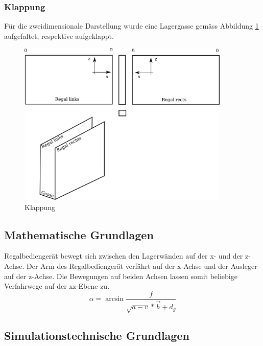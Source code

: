 \subsubsection{Klappung}
Für die zweidimensionale Darstellung wurde eine Lagergasse gemäss Abbildung \ref{fig:klapp} aufgefaltet, respektive aufgeklappt.
%
\begin{figure}[h]
  \begin{center}
    \includegraphics[width=0.9\textwidth]{images/klappung.png}
    \caption{Klappung}
    \label{fig:klapp}
  \end{center}
\end{figure}

%
\subsection{Mathematische Grundlagen}
Regalbediengerät bewegt sich zwischen den Lagerwänden auf der x- und der z-Achse. Der Arm des Regalbediengerät verfährt auf der x-Achse und der Ausleger auf der z-Achse. Die Bewegungen auf beiden Achsen lassen somit beliebige Verfahrwege auf der xz-Ebene zu. 
%
\begin{equation}
\alpha = \arcsin \frac{f}{\sqrt{a-v} * \vec{b} + d_{g}}
\end{equation}



%
\subsection{Simulationstechnische Grundlagen}





